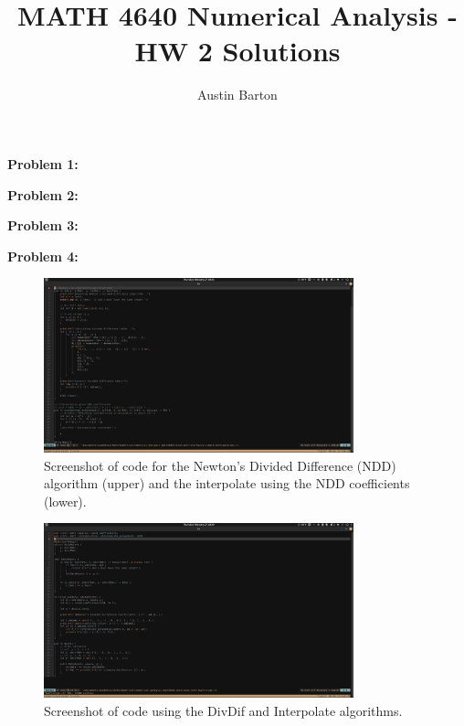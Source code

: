 \documentclass[12pt, letterpaper]{article}
\title{MATH 4640 Numerical Analysis - HW 2 Solutions}
\author{Austin Barton}
\theoremstyle{nonumberplain}
\begin{document}
\maketitle

\vspace{2em}

\hspace{18pt}\textbf{Problem 1:} \medskip


\hspace{18pt}\textbf{Problem 2:} \medskip

\hspace{18pt}\textbf{Problem 3:} \medskip

\hspace{18pt}\textbf{Problem 4:} \medskip
\begin{figure}[ht]
	\centering
	\includegraphics[width=0.8\textwidth]{ndd_and_interpolate_screenshot.png}
	\caption{Screenshot of code for the Newton's Divided Difference (NDD) algorithm (upper) and the interpolate using the NDD coefficients (lower).}
\end{figure}

\begin{figure}[ht]
	\centering
	\includegraphics[width=0.8\textwidth]{numhw2q4.png}
	\caption{Screenshot of code using the DivDif and Interpolate algorithms.}
\end{figure}
\end{document}
